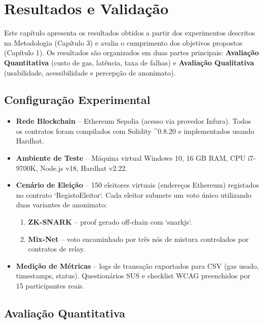 \chapter{Resultados e Validação}
\label{cap5}
\justifying

Este capítulo apresenta os resultados obtidos a partir dos experimentos descritos na Metodologia (Capítulo 3) e avalia o cumprimento dos objetivos propostos (Capítulo 1). Os resultados são organizados em duas partes principais: \textbf{Avaliação Quantitativa} (custo de gas, latência, taxa de falhas) e \textbf{Avaliação Qualitativa} (usabilidade, acessibilidade e percepção de anonimato).

\section{Configuração Experimental}
\begin{itemize}
    \item \textbf{Rede Blockchain} – Ethereum Sepolia (acesso via provedor Infura). Todos os contratos foram compilados com Solidity \textasciicircum 0.8.20 e implementados usando Hardhat.
    \item \textbf{Ambiente de Teste} – Máquina virtual Windows 10, 16 GB RAM, CPU i7-9700K, Node.js v18, Hardhat v2.22.
    \item \textbf{Cenário de Eleição} – 150 eleitores virtuais (endereços Ethereum) registados no contrato `RegistoEleitor`. Cada eleitor submete um voto único utilizando duas variantes de anonimato:
    \begin{enumerate}
        \item \textbf{ZK-SNARK} – proof gerado off-chain com `snarkjs`.
        \item \textbf{Mix-Net} – voto encaminhado por três nós de mistura controlados por contratos de relay.
    \end{enumerate}
    \item \textbf{Medição de Métricas} – logs de transação exportados para CSV (gas usado, timestamps, status). Questionários SUS e checklist WCAG preenchidos por 15 participantes reais.
\end{itemize}

\section{Avaliação Quantitativa}
